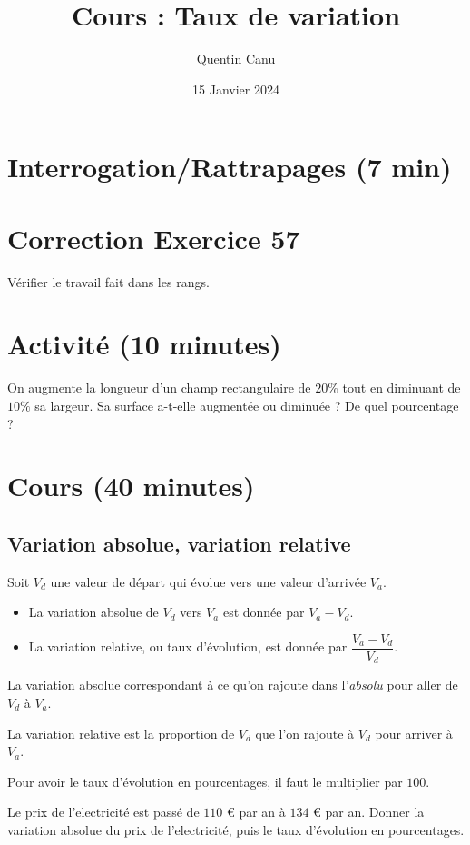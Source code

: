 \documentclass{article}
\title{Cours : Taux de variation}
\author{Quentin Canu}
\date{15 Janvier 2024}
\begin{document}
\maketitle
\section{Interrogation/Rattrapages (7 min)}
\section{Correction Exercice 57}
Vérifier le travail fait dans les rangs.
\section{Activité (10 minutes)}
On augmente la longueur d'un champ rectangulaire de $20\%$ tout en diminuant de $10\%$ sa largeur. Sa surface a-t-elle augmentée ou diminuée ? De quel pourcentage ?
\section{Cours (40 minutes)}
\subsection*{Variation absolue, variation relative}
\begin{definition}
Soit $V_d$ une valeur de départ qui évolue vers une valeur d'arrivée $V_a$.
\begin{itemize}
\item La variation absolue de $V_d$ vers $V_a$ est donnée par $V_a - V_d$.
\item La variation relative, ou taux d'évolution, est donnée par $\dfrac{V_a - V_d}{V_d}$.
\end{itemize}    
\end{definition}
\begin{remark}
La variation absolue correspondant à ce qu'on rajoute dans l'\emph{absolu} pour aller de $V_d$ à $V_a$. 

La variation relative est la proportion de $V_d$ que l'on rajoute à $V_d$ pour arriver à $V_a$.

Pour avoir le taux d'évolution en pourcentages, il faut le multiplier par $100$.
\end{remark}
\begin{example}
Le prix de l'electricité est passé de $110$ \euro{} par an à $134$ \euro{} par an.
Donner la variation absolue du prix de l'electricité, puis le taux d'évolution en pourcentages.
\end{example}
\end{document}
